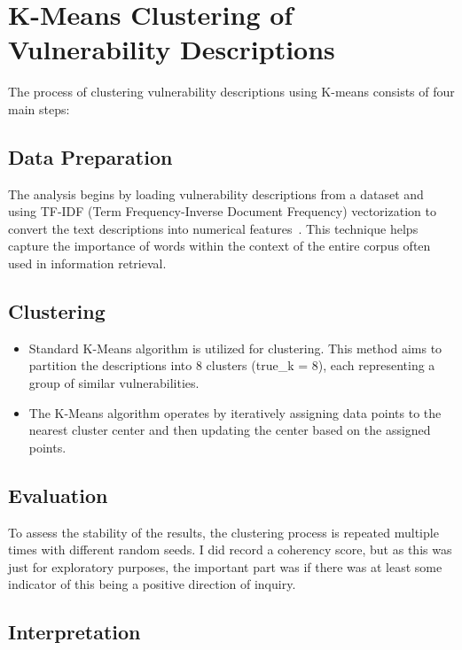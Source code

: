 \documentclass[12pt]{article}
\begin{document}
\section{K-Means Clustering of Vulnerability Descriptions}

The process of clustering vulnerability descriptions using K-means consists of four main steps:

\subsection{Data Preparation}

The analysis begins by loading vulnerability descriptions from a dataset and using TF-IDF
(Term Frequency-Inverse Document Frequency) vectorization to convert the text
descriptions into numerical features~\cite{tfidf}. This technique helps capture the
importance of words within the context of the entire corpus often used in information
retrieval.


\subsection{Clustering}

\begin{itemize}

	\item Standard K-Means algorithm is utilized for clustering. This method aims to partition the
	      descriptions into 8 clusters (true\_k = 8), each representing a group of similar
	      vulnerabilities.

	\item The K-Means algorithm operates by iteratively assigning data points to the nearest cluster
	      center and then updating the center based on the assigned points.

\end{itemize}

\subsection{Evaluation}


To assess the stability of the results, the clustering process is repeated multiple times
with different random seeds. I did record a coherency score, but as this was just for exploratory
purposes, the important part was if there was at least some indicator of this being a positive
direction of inquiry.


\subsection{Interpretation}
\end{document}
